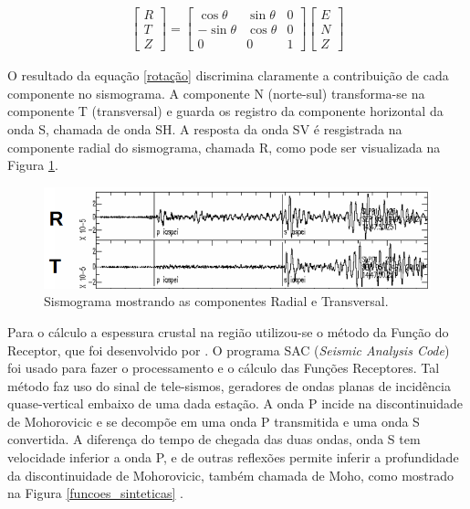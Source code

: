 \begin{eqnarray} \label{rotação}
\left[ \begin{array}{c} R \\ T \\ Z \end{array} \right] = \begin{bmatrix} \cos \theta & \sin \theta & 0 \\ - \sin \theta & \cos \theta & 0 \\ 0 & 0 & 1 \end{bmatrix} \left[ \begin{array}{c} E \\ N \\ Z \end{array} \right]
\end{eqnarray}


O resultado da equação \ref{rotação} discrimina claramente a contribuição de cada componente  no sismograma. A componente N (norte-sul) transforma-se na componente T (transversal) e guarda os registro da componente horizontal da onda S, chamada de onda SH. A resposta da onda SV é resgistrada na componente radial do sismograma, chamada R, como pode ser visualizada na Figura \ref{sismo_radial}.   

\begin{figure}[!ht]
\centering
\includegraphics[scale=0.6]{Componente_Radial_Transversal.png}
\caption{Sismograma mostrando as componentes Radial e Transversal.}
\label{sismo_radial}
\end{figure}

Para o cálculo a espessura crustal na região utilizou-se o método da Função do Receptor, que foi desenvolvido por \cite{Langston_1977}. O programa SAC (\textit{Seismic Analysis Code}) foi usado para fazer o processamento e o cálculo das Funções Receptores. Tal método faz uso do sinal de tele-sismos, geradores de ondas planas de incidência quase-vertical embaixo de uma dada estação. A onda P incide na discontinuidade de Mohorovicic e se decompõe em uma onda P transmitida e uma onda S convertida. A diferença do tempo de chegada das duas ondas, onda S tem velocidade inferior a onda P, e de outras reflexões permite inferir a profundidade da discontinuidade de Mohorovicic, também chamada de Moho, como mostrado na Figura \ref{funcoes_sinteticas} .

